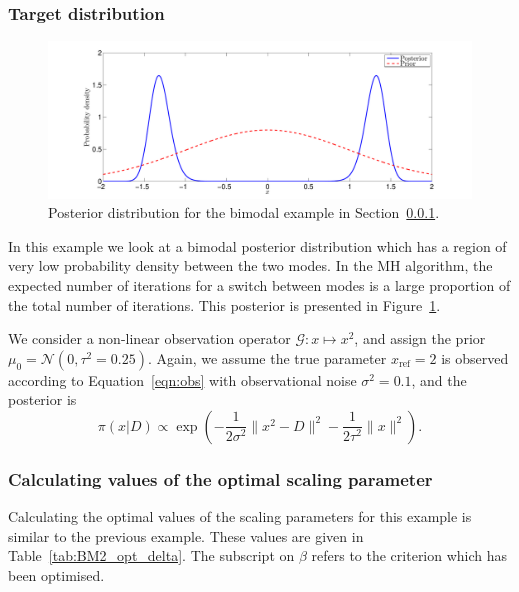 \documentclass[final]{siamltex}
\newcommand{\G}{\mathcal{G}}
\newcommand{\N}{\mathcal{N}}
\begin{document}

\subsubsection{Target distribution} \label{sec:tar}

\begin{figure}[htpb]
\begin{center}
\includegraphics[width=\textwidth]{"figures/BM2_posterior"}
\caption{Posterior distribution for the bimodal example in
Section~\ref{sec:tar}.}
\label{fig:BM2_posterior}
\end{center}
\end{figure}

In this example we look at a bimodal posterior distribution which has
a region of very low probability density between the two modes. In the MH algorithm, the
expected number of iterations for a switch between modes is a large
proportion of the total number of iterations. This posterior is presented in
Figure~\ref{fig:BM2_posterior}.

We consider a non-linear observation operator $\G\colon x \mapsto
x^2$, and assign the prior $\mu_0 = \N(0, \tau^2=0.25)$. Again, we
assume the true parameter $x_\text{ref}=2$ is observed according to
Equation~\eqref{eqn:obs} with observational noise $\sigma^2 = 0.1$,
and the posterior is
\[
	\pi(x|D) \propto \exp\left(-\frac{1}{2\sigma^2}\|x^2 - D\|^2
		 - \frac{1}{2\tau^2}\|x\|^2\right).
\]


\subsubsection{Calculating values of the optimal scaling parameter}
\label{sec:BM2_opt_beta}

Calculating the optimal values of the scaling parameters for this
example is similar to the previous example. These values are given in
Table~\ref{tab:BM2_opt_delta}. The subscript on $\beta$ refers to the
criterion which has been optimised.
\end{document}

